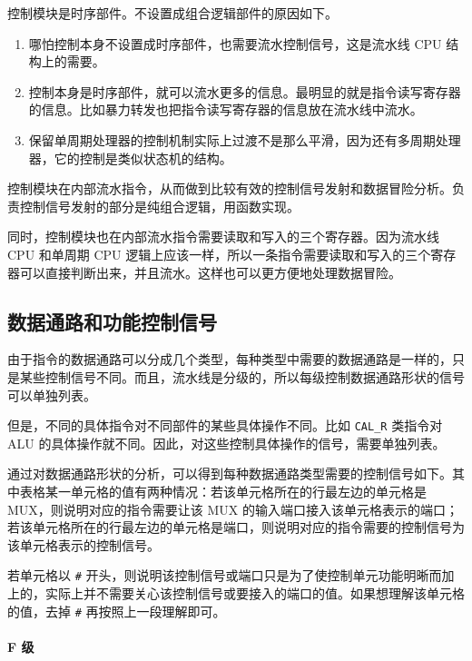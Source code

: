 \documentclass[12pt,AutoFakeBold,AutoFakeSlant]{article}
\providecommand{\tightlist}{%
  \setlength{\itemsep}{0pt}\setlength{\parskip}{0pt}}
\begin{document}
控制模块是时序部件。不设置成组合逻辑部件的原因如下。

\begin{enumerate}
\def\labelenumi{\arabic{enumi}.}
\tightlist
\item
  哪怕控制本身不设置成时序部件，也需要流水控制信号，这是流水线 CPU
  结构上的需要。
\item
  控制本身是时序部件，就可以流水更多的信息。最明显的就是指令读写寄存器的信息。比如暴力转发也把指令读写寄存器的信息放在流水线中流水。
\item
  保留单周期处理器的控制机制实际上过渡不是那么平滑，因为还有多周期处理器，它的控制是类似状态机的结构。
\end{enumerate}

控制模块在内部流水指令，从而做到比较有效的控制信号发射和数据冒险分析。负责控制信号发射的部分是纯组合逻辑，用函数实现。

同时，控制模块也在内部流水指令需要读取和写入的三个寄存器。因为流水线 CPU
和单周期 CPU
逻辑上应该一样，所以一条指令需要读取和写入的三个寄存器可以直接判断出来，并且流水。这样也可以更方便地处理数据冒险。

\hypertarget{ux6570ux636eux901aux8defux548cux529fux80fdux63a7ux5236ux4fe1ux53f7}{%
\subsection{数据通路和功能控制信号}\label{ux6570ux636eux901aux8defux548cux529fux80fdux63a7ux5236ux4fe1ux53f7}}

由于指令的数据通路可以分成几个类型，每种类型中需要的数据通路是一样的，只是某些控制信号不同。而且，流水线是分级的，所以每级控制数据通路形状的信号可以单独列表。

但是，不同的具体指令对不同部件的某些具体操作不同。比如 \texttt{CAL\_R}
类指令对 ALU
的具体操作就不同。因此，对这些控制具体操作的信号，需要单独列表。

通过对数据通路形状的分析，可以得到每种数据通路类型需要的控制信号如下。其中表格某一单元格的值有两种情况：若该单元格所在的行最左边的单元格是
MUX，则说明对应的指令需要让该 MUX
的输入端口接入该单元格表示的端口；若该单元格所在的行最左边的单元格是端口，则说明对应的指令需要的控制信号为该单元格表示的控制信号。

若单元格以 \texttt{\#}
开头，则说明该控制信号或端口只是为了使控制单元功能明晰而加上的，实际上并不需要关心该控制信号或要接入的端口的值。如果想理解该单元格的值，去掉
\texttt{\#} 再按照上一段理解即可。

\hypertarget{f-ux7ea7}{%
\paragraph{F 级}\label{f-ux7ea7}}
\end{document}

